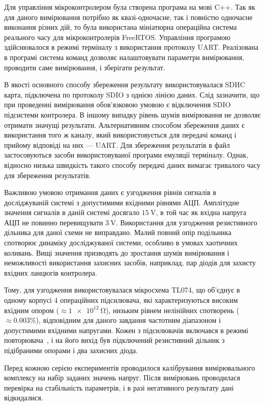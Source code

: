 Для управління мікроконтролером була створена програма на
мові C++. Так як для даного вимірювання потрібно як квазі-одночасне,
так і повністю одночасне виконання різних дій, то була
використана мініатюрна операційна система реального часу для
мікроконтролерів FreeRTOS. Управління програмою здійснювалося
в режимі терміналу з використання протоколу UART. Реалізована
в програмі система команд дозволяє налаштовувати параметри
вимірювання, проводити саме вимірювання, і зберігати результат.

В якості основного способу збереження результату
використовувалася SDHC карта, підключена по протоколу SDIO з однією
лінією даних. Слід зазначити, що при проведенні вимірювання
обов'язковою умовою є відключення SDIO підсистеми контролера. В
іншому випадку рівень шумів вимірювання не дозволяє отримати
значущі результати. Альтернативним способом збереження
даних є використання того ж каналу, який використовується для
передачі команд і прийому відповіді на них --- UART. Для збереження
результатів в файл застосовуються засоби використовуваної
програми емуляції терміналу. Однак, відносно низька швидкість
такого способу передачі даних вимагає тривалого часу для
збереження результатів.

Важливою умовою отримання даних є узгодження рівнів сигналів
в досліджуваній системі з допустимими вхідними рівнями
АЦП. Амплітудне значення сигналів в даній системі досягало
$\SI{15}{\volt} $, в той час як вхідна напруга АЦП не повинно
перевищувати
$\SI{3}{\volt} $. Використання для узгодження резистивного дільника
для даної схеми не виправдано. Малий повний опір подільника
спотворює динаміку досліджуваної системи, особливо в умовах
хаотичних коливань. Вищі значення призводять до зростання шумів
вимірювання і неможливості використання захисних засобів,
наприклад, пар діодів для захисту вхідних ланцюгів контролера.

Тому, для узгодження використовувалася мікросхема TL074, що
об'єднує в одному корпусі 4 операційних підсилювача, які
характеризуються високим вхідним опором ($ \approx \SI{1e12}{\ohm} $),
низьким рівнем нелінійних спотворень ($ \approx 0.003 \% $),
відповідним для даного завдання частотним
діапазоном і допустимими вхідними напругами. Кожен з
підсилювачів включався в режимі повторювача~\cite{horowitz}, і на
його вихід був підключений резистивний дільник з підібраними
опорами і два захисних діода.

Перед кожною серією експериментів проводилося калібрування
вимірювального комплексу на набір заданих значень напруг. Після
вимірювань проводилася перевірка на стабільність параметрів,
і в разі негативного результату дані відкидалися.


